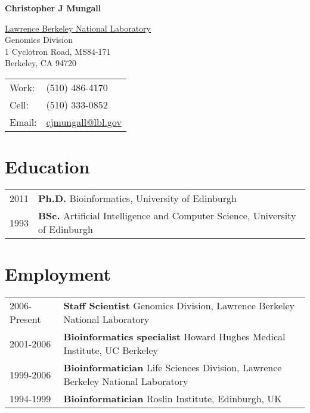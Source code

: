 \documentclass[11pt,fullpage]{article}
\def\name{Christopher J Mungall}
\begin{document}


\centerline{\Large \bf \name}

\vspace{0.25in}

\begin{minipage}{0.50\linewidth}
  \href{http://www.lbl.gov/}{Lawrence Berkeley National Laboratory} \\
  Genomics Division \\
  1 Cyclotron Road, MS84-171 \\
  Berkeley, CA 94720
\end{minipage}
\begin{minipage}{0.50\linewidth}
  \begin{tabular}{ll}
    Work: & (510) 486-4170 \\
    Cell: & (510) 333-0852 \\
    Email: & \href{mailto:cjmungall@lbl.gov}{cjmungall@lbl.gov} \\
  \end{tabular}
\end{minipage}

\section*{Education}

\begin{tabular}{ll}
	2011 & {\bf Ph.D.} Bioinformatics, University of Edinburgh \\
	1993 & {\bf BSc.} Artificial Intelligence and Computer
        Science, University of Edinburgh \\
\end{tabular}

\section*{Employment}


\begin{tabular}{ll}
	2006-Present & {\bf Staff Scientist} Genomics Division, Lawrence
        Berkeley National Laboratory \\
	2001-2006 & {\bf Bioinformatics specialist} Howard Hughes
        Medical Institute, UC Berkeley \\
	1999-2006 & {\bf Bioinformatician} Life Sciences Division, Lawrence
        Berkeley National Laboratory \\
	1994-1999 & {\bf Bioinformatician} Roslin Institute,
        Edinburgh, UK \\
\end{tabular}
\end{document}
